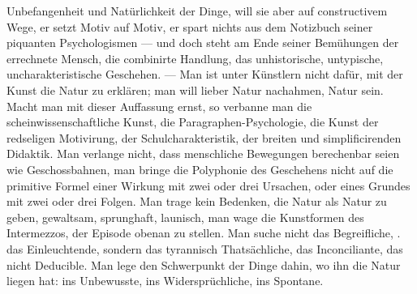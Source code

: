 Unbefangenheit und Natürlichkeit der Dinge, will sie aber auf constructivem Wege, er setzt Motiv auf Motiv, er spart nichts aus dem Notizbuch seiner piquanten Psychologismen — und doch steht am Ende seiner Bemühungen der errechnete Mensch, die combinirte Handlung, das unhistorische, untypische, uncharakteristische Geschehen. — Man ist unter Künstlern nicht dafür, mit der Kunst die Natur zu erklären; man will lieber Natur nachahmen, Natur sein. Macht man mit dieser Auffassung ernst, so verbanne man die scheinwissenschaftliche Kunst, die Paragraphen-Psychologie, die Kunst der redseligen Motivirung, der Schulcharakteristik, der breiten und simplificirenden Didaktik. Man verlange nicht, dass menschliche Bewegungen berechenbar seien wie Geschossbahnen, man bringe die Polyphonie des Geschehens nicht auf die primitive Formel einer Wirkung mit zwei oder drei Ursachen, oder eines Grundes mit zwei oder drei Folgen. Man trage kein Bedenken, die Natur als Natur zu geben, gewaltsam, sprunghaft, launisch, man wage die Kunstformen des Intermezzos, der Episode obenan zu stellen. Man suche nicht das Begreifliche, . das Einleuchtende, sondern das tyrannisch Thatsächliche, das Inconciliante, das nicht Deducible. Man lege den Schwerpunkt der Dinge dahin, wo ihn die Natur liegen hat: ins Unbewusste, ins Widersprüchliche, ins Spontane.
\par

